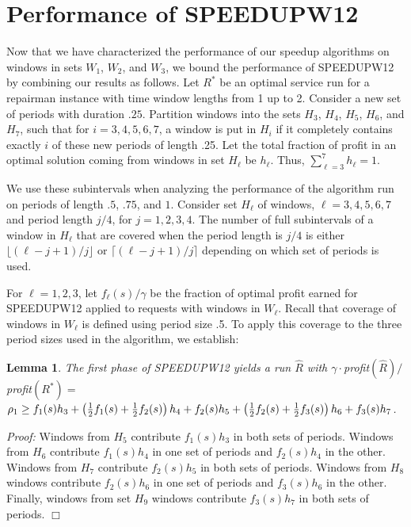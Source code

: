 \documentclass[11pt]{article}
\newtheorem{lemma}{Lemma}[section]
\newcommand\QED{\ifhmode\allowbreak\else\nobreak\fi
\quad\nobreak$\Box$\medbreak}
\newcommand{\proofstart}{\par\noindent \emph{Proof:} }
\newcommand{\proofend}{\QED\par}
\newenvironment{proof}{\proofstart}{\proofend}
\begin{document}
\section{Performance of SPEEDUPW12}
\label{section:performance of speedupw12}

Now that we have characterized the performance of our speedup algorithms on windows in sets $W_1$, $W_2$, and $W_3$, we bound the performance of SPEEDUPW12 by combining our results as follows.
Let $R^*$ be an optimal service run for a repairman instance with time window lengths from 1 up to 2.
Consider a new set of periods with duration $.25$. Partition windows into the sets $H_3$, $H_4$, $H_5$, $H_6$, and $H_7$, such that for $i = 3, 4, 5, 6, 7$, a window is put in $H_i$ if it completely contains exactly $i$ of these new periods of length .25.  Let the total fraction of profit in an optimal solution coming from windows in set $H_\ell$ be $h_\ell$.  Thus, $\sum_{\ell = 3}^7 h_\ell = 1$.


We use these subintervals when analyzing the performance of the algorithm run on periods of length $.5$, $.75$, and $1$.  Consider set $H_\ell$ of windows, $\ell = 3, 4, 5, 6, 7$ and period length $j/4$, for $j = 1, 2, 3, 4$.
The number of full subintervals of a window in $H_\ell$ that are covered when the period length is $j/4$ is either
$\lfloor (\ell - j + 1)/j\rfloor$ or $\lceil (\ell - j + 1)/j\rceil$
depending on which set of periods is used.

For $\ell = 1, 2, 3$, let $f_\ell(s)/\gamma$ be the fraction of optimal profit earned for SPEEDUPW12
applied to requests with windows in $W_\ell$.  Recall that coverage of windows in $W_\ell$ is defined using period size .5.  To apply this coverage to the three period sizes used in the algorithm, we establish:

\begin{lemma}
\label{lemma:phase1}
The first phase of SPEEDUPW12 yields a run $\hat{R}$ with 
$\gamma\cdot$profit$(\hat{R})/$profit$(R^*) = $\\
\hspace*{.2in}$\rho_1 \geq f_1(s) h_3 + \left( {1 \over 2}f_1(s)+{1 \over 2}f_2(s)\right) h_4 + f_2(s) h_5 + \left( {1 \over 2}f_2(s)+{1 \over 2}f_3(s)\right) h_6 + f_3(s) h_7$.
\end{lemma}

\begin{proof}
Windows from $H_5$ contribute $f_1(s)h_3$ in both sets of periods.  Windows from $H_6$ contribute $f_1(s)h_4$ in one set of periods and $f_2(s)h_4$ in the other.  Windows from $H_7$ contribute $f_2(s)h_5$ in both sets of periods.  Windows from $H_8$ windows contribute $f_2(s)h_6$ in one set of periods and $f_3(s)h_6$ in the other.  Finally, windows from set $H_9$ windows contribute $f_3(s)h_7$ in both sets of periods.
\end{proof}
\end{document}
